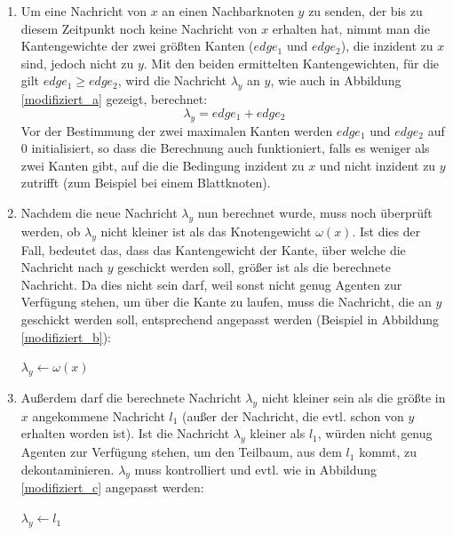 \begin{enumerate}[label=\alph*)]
	
	\item 
		Um eine Nachricht von $x$ an einen Nachbarknoten $y$ zu senden, der bis zu diesem Zeitpunkt noch keine Nachricht von $x$ erhalten hat, nimmt man die Kantengewichte der zwei größten Kanten ($edge_{1}$ und $edge_{2}$), die inzident zu $x$ sind, jedoch nicht zu $y$. Mit den beiden ermittelten Kantengewichten, für die gilt $edge_{1} \ge edge_{2}$, wird die Nachricht $\lambda_{y}$ an $y$, wie auch in Abbildung \ref{modifiziert_a} gezeigt, berechnet:
		$$\lambda_{y} = edge_{1} + edge_{2}$$
		Vor der Bestimmung der zwei maximalen Kanten werden $edge_{1}$ und $edge_{2}$ auf 0 initialisiert, so dass die Berechnung auch funktioniert, falls es weniger als zwei Kanten gibt, auf die die Bedingung inzident zu $x$ und nicht inzident zu $y$ zutrifft (zum Beispiel bei einem Blattknoten).
	
	\item
		Nachdem die neue Nachricht $\lambda_{y}$ nun berechnet wurde, muss noch überprüft werden, ob $\lambda_{y}$ nicht kleiner ist als das Knotengewicht $\omega(x)$. Ist dies der Fall, bedeutet das, dass das Kantengewicht der Kante, über welche die Nachricht nach $y$ geschickt werden soll, größer ist als die berechnete Nachricht. Da dies nicht sein darf, weil sonst nicht genug Agenten zur Verfügung stehen, um über die Kante zu laufen, muss die Nachricht, die an $y$ geschickt werden soll, entsprechend angepasst werden (Beispiel in Abbildung \ref{modifiziert_b}):
		
		\begin{algorithmic}
			\State $\lambda_{y} \gets \omega(x)$
			\EndIf
		\end{algorithmic}
	
	\item
		Außerdem darf die berechnete Nachricht $\lambda_{y}$ nicht kleiner sein als die größte in $x$ angekommene Nachricht $l_{1}$ (außer der Nachricht, die evtl. schon von $y$ erhalten worden ist). Ist die Nachricht $\lambda_{y}$ kleiner als $l_{1}$, würden nicht genug Agenten zur Verfügung stehen, um den Teilbaum, aus dem $l_{1}$ kommt, zu dekontaminieren. $\lambda_{y}$ muss kontrolliert und evtl. wie in Abbildung \ref{modifiziert_c} angepasst werden:
		
		\begin{algorithmic}
			\If {$\lambda_{y} \leq l_{1}$}
			\State $\lambda_{y} \gets l_{1}$
			\EndIf
		\end{algorithmic}
	
\end{enumerate}

